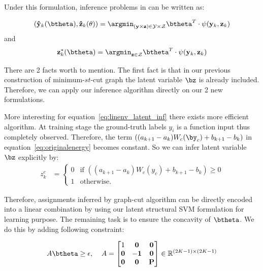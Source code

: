 \documentclass[sigconf]{acmart}
\renewcommand{\cite}{\citep}
\begin{document}
Under this formulation, inference problems in
\cite{yu2009learning} can be written as:

\begin{align}
  \label{eq:linenv_full_inf}
  (\mathbf{\hat{y}}_k(\btheta),\mathbf{\hat{z}}_k(\theta))=\argmin_{(\mathbf{y}
  \times \mathbf{z}) \in \mathcal{Y} \times \mathcal{Z}}
  \btheta^T\cdot\psi(\mathbf{y}_k,\mathbf{z}_k)
\end{align}
and
\begin{align}
  \label{eq:linenv_latent_inf}
  \mathbf{z}^*_k(\btheta) = \argmin_{\mathbf{z} \in \mathcal{Z}}
  \btheta^T \cdot \psi(\mathbf{y}_k,\mathbf{z}_k)
\end{align}

There are 2 facts worth to mention. The first fact is
that in our previous construction of minimum-$st$-cut graph the
latent variable $\bz$ is already included. Therefore, we can
apply our inference algorithm directly on our 2 new formulations.

More interesting for equation~\eqref{eq:linenv_latent_inf} there exists
more efficient algorithm. At training stage the ground-truth
labels $y_i$ is a function input thus completely observed.
Therefore, the term $((a_{k+1}-a_k)W_c(\by_c)+b_{k+1}-b_k)$ in
equation~\eqref{eq:originalenergy} becomes constant. So we can
infer latent variable $\bz$ explicitly by:
\begin{align}
  \label{eq:linenv_effi_infer_latent}
  z_k^c &=
          \begin{cases}
            0 & \text{if $((a_{k+1}-a_k)W_c(y_c)+b_{k+1}-b_k)\geq0$} \\
            1 & \text{otherwise}.
          \end{cases}
\end{align}

Therefore, assignments inferred by graph-cut algorithm can be
directly encoded into a linear combination by using our latent
structural SVM formulation for learning purpose. The remaining
task is to ensure the concavity of $\btheta$. We do this by
adding following constraint:

\begin{align}
  \label{eq:concave_constraint}
  A\btheta\geq\epsilon \text{,\;~~~} A=
                  \begin{bmatrix}
                    1 & \mathbf{0} & \mathbf{0}\\
                    \mathbf{0} & -\mathbf{1} & \mathbf{0}\\
                    \mathbf{0} & \mathbf{0} & \mathbf{P}
                  \end{bmatrix}\in \mathbb{R}^{(2K-1)\times(2K-1)}
\end{align}
\end{document}
